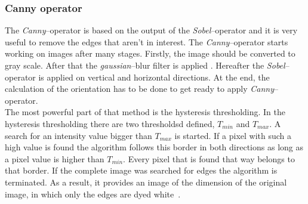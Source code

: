\documentclass[journal,final,a4paper,twoside]{PS}
\begin{document}
\subsubsection{Canny operator}
The \emph{Canny}--operator is based on the output of the \emph{Sobel}--operator and it is very useful to remove the edges that aren't in interest. 
The \emph{Canny}--operator starts working on images after many stages. Firstly, the image should be converted to gray scale. After that the \emph{gaussian}--blur filter is applied \cite{opencv}. Hereafter the \emph{Sobel}--operator is applied on vertical and horizontal directions. At the end, the calculation of the orientation has to be done to get ready to apply \emph{Canny}--operator.
\\
The most powerful part of that method is the hysteresis thresholding. In the hysteresis thresholding there are two thresholdsd defined, $T_{min}$ and $T_{max}$. A search for an intensity value bigger than $T_{max}$ is started. If a pixel with such a high value is found the algorithm follows this border in both directions as long as a pixel value is higher than $T_{min}$. Every pixel that is found that way belongs to that border. If the complete image was searched for edges the algorithm is terminated. As a result, it provides an image of the dimension of the original image, in which only the edges are dyed white~\cite{opencv}.
\end{document}
